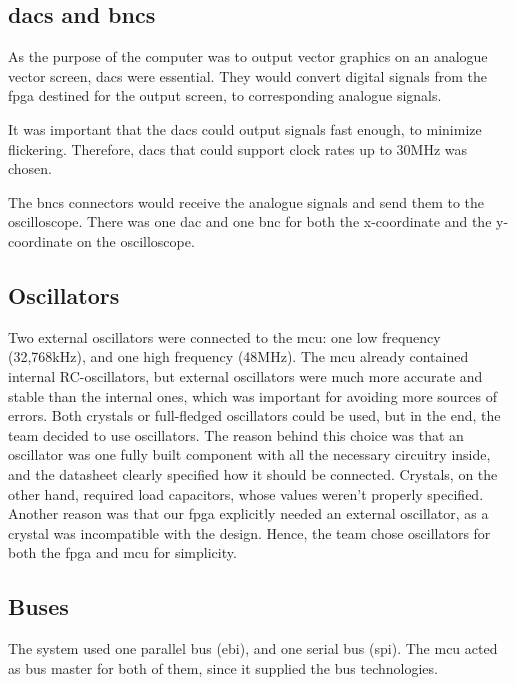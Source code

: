 \subsection{\gls{dac}s and \gls{bnc}s}
As the purpose of the computer was to output vector graphics on an analogue vector screen, \gls{dac}s were essential.
They would convert digital signals from the \gls{fpga} destined for the output screen, to corresponding analogue signals.

It was important that the \gls{dac}s could output signals fast enough, to minimize flickering.
Therefore, \gls{dac}s that could support clock rates up to 30MHz was chosen.

The \gls{bnc}s connectors would receive the analogue signals and send them to the oscilloscope.
There was one \gls{dac} and one \gls{bnc} for both the x-coordinate and the y-coordinate on the oscilloscope.

\subsection{Oscillators}
Two external oscillators were connected to the \gls{mcu}: one low frequency (32,768kHz), and one high frequency (48MHz).
The \gls{mcu} already contained internal RC-oscillators, but external oscillators were much more accurate and stable than the internal ones, which was important for avoiding more sources of errors.
Both crystals or full-fledged oscillators could be used, but in the end, the team decided to use oscillators.
The reason behind this choice was that an oscillator was one fully built component with all the necessary circuitry inside, and the datasheet clearly specified how it should be connected.
Crystals, on the other hand, required load capacitors, whose values weren't properly specified.
Another reason was that our \gls{fpga} explicitly needed an external oscillator, as a crystal was incompatible with the design.
Hence, the team chose oscillators for both the \gls{fpga} and \gls{mcu} for simplicity.

\subsection{Buses}
The system used one parallel bus (\gls{ebi}), and one serial bus (\gls{spi}).
The \gls{mcu} acted as bus master for both of them, since it supplied the bus technologies.

